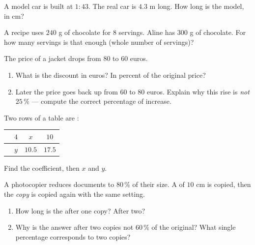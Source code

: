 \begin{exercise}[$\star$]\label{exo:g7:prop:7}
A model car is built at  $1 : 43$. The real car is $4.3$ m long.
How long is the model, in cm?
\end{exercise}

\begin{exercise}[$\star\star$]\label{exo:g7:prop:8}
A recipe uses $240$ g of chocolate for $8$ servings. Aline has
$300$ g of chocolate. For how many servings is that enough (whole
number of servings)?
\end{exercise}

\begin{exercise}[$\star\star$]\label{exo:g7:prop:9}
The price of a jacket drops from $80$ to $60$ euros.
\begin{enumerate}
  \item What is the discount in euros? In percent of the original
        price?
  \item Later the price goes back up from $60$ to $80$ euros. Explain
        why this rise is \emph{not} $25\,\%$ --- compute the correct
        percentage of increase.
\end{enumerate}
\end{exercise}

\begin{exercise}[$\star\star$]\label{exo:g7:prop:10}
Two rows of a table are :
\begin{center}
\renewcommand{\arraystretch}{1.2}
\begin{tabular}{l|ccc}
 & $4$ & $x$ & $10$ \\
\hline
 & $y$ & $10.5$ & $17.5$ \\
\end{tabular}
\end{center}
Find the coefficient, then $x$ and $y$.
\end{exercise}

\begin{exercise}[$\star\star\star$]\label{exo:g7:prop:11}
A photocopier reduces documents to $80\,\%$ of their size. A 
of $10$ cm is copied, then the \emph{copy} is copied again with the
same setting.
\begin{enumerate}
  \item How long is the  after one copy? After two?
  \item Why is the answer after two copies not $60\,\%$ of the
        original? What single percentage corresponds to two copies?
\end{enumerate}
\end{exercise}

